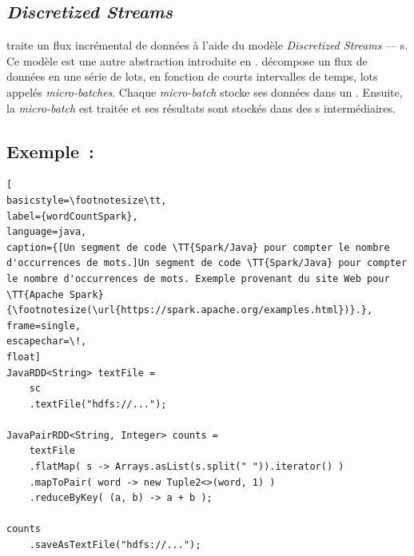 

\subsection{\emph{Discretized Streams}}

 traite un flux incr\'emental de donn\'ees \`a l'aide du mod\`ele \emph{Discretized Streams} --- s.   
%
Ce mod\`ele est une autre abstraction introduite en . 
 d\'ecompose un flux de donn\'ees en une s\'erie de lots, en fonction de courts intervalles de temps, lots appel\'es \emph{micro-batches}. Chaque \emph{micro-batch} stocke ses donn\'ees dans un . Ensuite, la \emph{micro-batch} est trait\'ee et ses r\'esultats sont stock\'es dans des s interm\'ediaires.


\subsection{Exemple~: }


\begin{lstlisting}[
basicstyle=\footnotesize\tt,
label={wordCountSpark},
language=java,
caption={[Un segment de code \TT{Spark/Java} pour compter le nombre d'occurrences de mots.]Un segment de code \TT{Spark/Java} pour compter le nombre d'occurrences de mots. Exemple provenant du site Web pour \TT{Apache Spark} {\footnotesize(\url{https://spark.apache.org/examples.html})}.},
frame=single,
escapechar=\!,
float]
JavaRDD<String> textFile = 
    sc
    .textFile("hdfs://...");

JavaPairRDD<String, Integer> counts = 
    textFile
    .flatMap( s -> Arrays.asList(s.split(" ")).iterator() )
    .mapToPair( word -> new Tuple2<>(word, 1) )
    .reduceByKey( (a, b) -> a + b );

counts
    .saveAsTextFile("hdfs://...");
\end{lstlisting}



